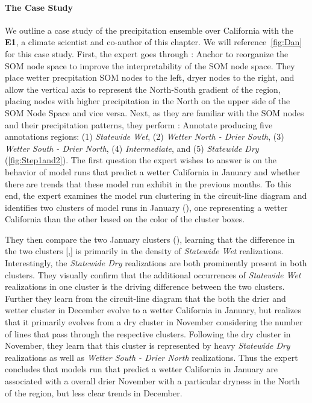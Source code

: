 \paragraph{The Case Study}
We outline a case study of the precipitation ensemble over California with the \textbf{E1}, a climate scientist and co-author of this chapter.
%
We will reference~\cref{fig:Dan} for this case study.
%
First, the expert goes through : Anchor to reorganize the SOM node space to improve the interpretability of the SOM node space.
%
They place wetter precpitation SOM nodes to the left, dryer nodes to the right, and allow the vertical axis to represent the North-South gradient of the region, placing nodes with higher precipitation in the North on the upper side of the SOM Node Space and vice versa.
%
Next, as they are familiar with the SOM nodes and their precipitation patterns, they perform : Annotate producing five annotations regions: (1) \textit{Statewide Wet}, (2) \textit{Wetter North - Drier South}, (3) \textit{Wetter South - Drier North}, (4) \textit{Intermediate}, and (5) \textit{Statewide Dry} (\cref{fig:Step1and2}).
%
The first question the expert wishes to answer is on the behavior of model runs that predict a wetter California in January and whether there are trends that these model run exhibit in the previous months.
% 
To this end, the expert examines the model run clustering in the circuit-line diagram and identifies two clusters of model runs in January (), one representing a wetter California than the other based on the color of the cluster boxes.

They then compare the two January clusters (), learning that the difference in the two clusters [,] is primarily in the density of \textit{Statewide Wet} realizations.
%
Interestingly, the \textit{Statewide Dry} realizations are both prominently present in both clusters.
%
They visually confirm that the additional occurrences of \textit{Statewide Wet} realizations in one cluster is the driving difference between the two clusters.
%
%
Further they learn from the circuit-line diagram that the both the drier and wetter cluster in December evolve to a wetter California in January, but realizes that it primarily evolves from a dry cluster in November considering the number of lines that pass through the respective clusters.
%
Following the dry cluster in November, they learn that this cluster is represented by heavy \textit{Statewide Dry} realizations as well as \textit{Wetter South - Drier North} realizations.
%
Thus the expert concludes that models run that predict a wetter California in January are associated with a overall drier November with a particular dryness in the North of the region, but less clear trends in December.

